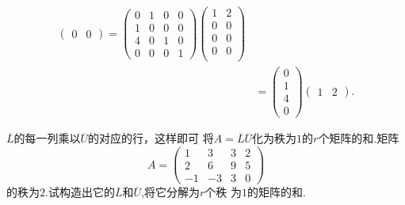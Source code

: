 ﻿\documentclass{book} \usepackage{exsheets} \usepackage{xeCJK}
\begin{document}
\begin{solution}
\begin{align*}
\begin{pmatrix}
                          0&0
                        \end{pmatrix}=
                             \begin{pmatrix}
                               0&1&0&0\\
                               1&0&0&0\\
                               4&0&1&0\\
                               0&0&0&1
                             \end{pmatrix}
                                      \begin{pmatrix}
                                        1&2\\
                                        0&0\\
                                        0&0\\
                                        0&0\\
                                      \end{pmatrix}
   \\&=
       \begin{pmatrix}
         0\\
         1\\
         4\\
         0
       \end{pmatrix}
   \begin{pmatrix}
     1&2
   \end{pmatrix}.
 \end{align*}
\end{solution}
\begin{question}
  $\overline{L}$的每一列乘以$\overline{U}$的对应的行，这样即可
  将$A=\overline{L}\overline{U}$化为秩为$1$的$r$个矩阵的和.矩阵
$$
A=
\begin{pmatrix}
  1&3&3&2\\
  2&6&9&5\\
  -1&-3&3&0
\end{pmatrix}
$$
的秩为$2$.试构造出它的$\overline{L}$和$\overline{U}$,将它分解为$r$个秩
为$1$的矩阵的和.
\end{question}
\end{document}
